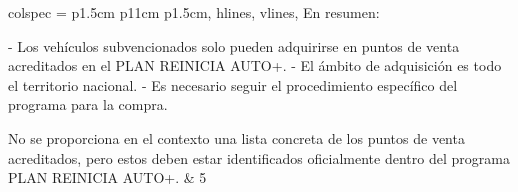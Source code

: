 \begin{table}[H]
\begin{tblr}{
    				colspec = {p{1.5cm} p{11cm} p{1.5cm}},
    				hlines,
    				vlines,
    			}
    			En resumen:
    			
    			- Los vehículos subvencionados solo pueden adquirirse en puntos de venta acreditados en el PLAN REINICIA AUTO+.
    			- El ámbito de adquisición es todo el territorio nacional.
    			- Es necesario seguir el procedimiento específico del programa para la compra.
    			
    			No se proporciona en el contexto una lista concreta de los puntos de venta acreditados, pero estos deben estar identificados oficialmente dentro del programa PLAN REINICIA AUTO+. & 5 \\       			 		    			
    		\end{tblr}
    		\caption{Comparativa de respuestas a pregunta 2}
    		\label{tab:evo_preg2}
    	\end{table} 
    	
